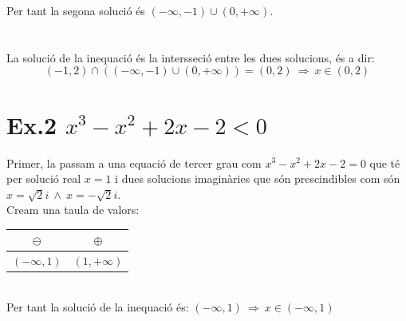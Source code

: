 Per tant la segona solució és $(-\infty,-1)\cup(0,+\infty)$.
\\
\\
\\
La solució de la inequació és la intersseció entre les dues solucions, és a dir:
\begin{equation*}
(-1,2)\cap((-\infty,-1)\cup(0,+\infty))=(0,2) \ \Longrightarrow \ x\in(0,2)
\end{equation*}
\newpage
\section*{Ex.2 $x^3-x^2+2x-2<0$}
Primer, la passam a una equació de tercer grau com $x^3-x^2+2x-2=0$ que té per solució real $x=1$ i dues solucions imaginàries que són prescindibles com són $x=\sqrt{2}i \ \wedge \ x=-\sqrt{2}i$.
\\
Cream una taula de valors:
\begin{table}[h!]
\begin{center}
\begin{tabular}{c|c}
$\ominus$ & $\oplus$\\
\hline
$(-\infty,1)$ & $(1,+\infty)$
\end{tabular}
\end{center}
\end{table}
\\
Per tant la solució de la inequació és:
$(-\infty, 1) \ \Longrightarrow \ x\in(-\infty, 1)$
\\
